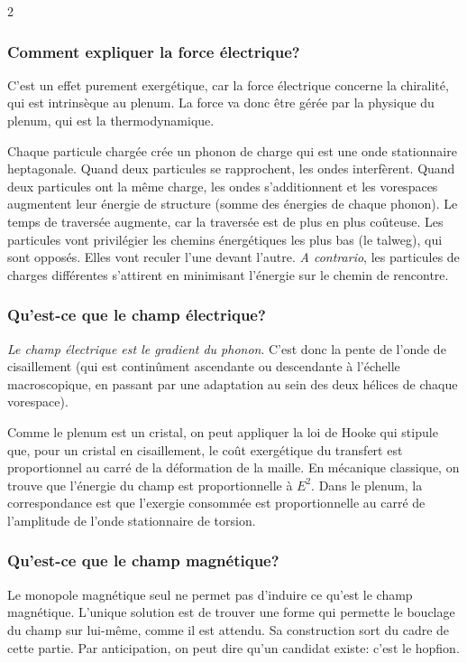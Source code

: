 \begin{multicols}{2}
\subsubsection*{Comment expliquer la force électrique?}

C'est un effet purement exergétique, car la force électrique concerne
la chiralité, qui est intrinsèque au plenum. La force va donc être
gérée par la physique du plenum, qui est la thermodynamique.

Chaque particule chargée crée un phonon de charge qui est une onde
stationnaire heptagonale. Quand deux particules se rapprochent, les
ondes interfèrent. Quand deux particules ont la même charge, les ondes
s'additionnent et les vorespaces augmentent leur énergie de structure
(somme des énergies de chaque phonon). Le temps de traversée augmente, car la traversée est de plus en plus coûteuse. Les particules vont
privilégier les chemins énergétiques les plus bas (le talweg), qui
sont opposés. Elles vont reculer l'une devant l'autre. \textit{A contrario},
les particules de charges différentes s'attirent en minimisant
l'énergie sur le chemin de rencontre.

\subsubsection*{Qu'est-ce que le champ électrique?}

\textit{Le champ électrique est le gradient du phonon}. C'est donc la pente de
l'onde de cisaillement (qui est continûment ascendante ou descendante
à l'échelle macroscopique, en passant par une adaptation au sein des
deux hélices de chaque vorespace).

Comme le plenum est un cristal, on peut appliquer la loi de Hooke qui
stipule que, pour un cristal en cisaillement, le coût exergétique du
transfert est proportionnel au carré de la déformation de la maille.
En mécanique classique, on trouve que l'énergie du champ est
proportionnelle à $E^2$. Dans le plenum, la correspondance est que
l'exergie consommée est proportionnelle au carré de l'amplitude de
l'onde stationnaire de torsion.

\subsubsection*{Qu'est-ce que le champ magnétique?}

Le monopole magnétique seul ne permet pas d'induire ce qu'est le champ
magnétique. L'unique solution est de trouver une forme qui permette le
bouclage du champ sur lui-même, comme il est attendu. Sa construction
sort du cadre de cette partie. Par anticipation, on peut dire qu'un
candidat existe: c'est le hopfion.


\end{multicols}
